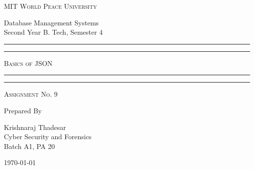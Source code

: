 \documentclass[11pt]{article}
\begin{document}
\begin{titlepage}
    \centering


    \huge\textsc{
        MIT World Peace University
    }\\

    \vspace{0.75\baselineskip} %

    \LARGE{
        Database Management Systems\\
        Second Year B. Tech, Semester 4
    }

    \vfill %


    \rule{\textwidth}{1.6pt}\vspace*{-\baselineskip}\vspace*{2pt}
    \rule{\textwidth}{0.6pt}
    \vspace{0.75\baselineskip} %



    \huge{\textsc{
            Basics of JSON
        }} \\



    \vspace{0.5\baselineskip} %
    \rule{\textwidth}{0.6pt}\vspace*{-\baselineskip}\vspace*{2.8pt}
    \rule{\textwidth}{1.6pt}

    \vspace{1\baselineskip} %


    \LARGE\textsc{
        Assignment No. 9
    } %
    \vfill


    Prepared By
    \vspace{0.5\baselineskip} %

    \Large{
        Krishnaraj Thadesar \\
        Cyber Security and Forensics\\
        Batch A1, PA 20
    }


    \vspace{0.5\baselineskip} %
    \today

\end{titlepage}
\end{document}
